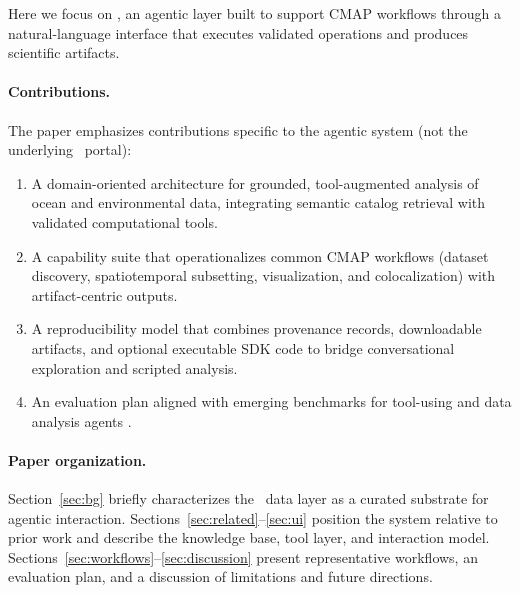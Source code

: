 Here we focus on \cmapagent, an agentic layer built to support CMAP workflows through a natural-language interface that executes validated operations and produces scientific artifacts.

\paragraph{Contributions.}
The paper emphasizes contributions specific to the agentic system (not the underlying \cmap\ portal):
\begin{enumerate}[leftmargin=*]
  \item A domain-oriented architecture for grounded, tool-augmented analysis of ocean and environmental data, integrating semantic catalog retrieval with validated computational tools.
  \item A capability suite that operationalizes common CMAP workflows (dataset discovery, spatiotemporal subsetting, visualization, and colocalization) with artifact-centric outputs.
  \item A reproducibility model that combines provenance records, downloadable artifacts, and optional executable SDK code to bridge conversational exploration and scripted analysis.
  \item An evaluation plan aligned with emerging benchmarks for tool-using and data analysis agents \citep{Zhang2024DSEval,Li2025IDABench}.
\end{enumerate}

\paragraph{Paper organization.}
Section~\ref{sec:bg} briefly characterizes the \cmap\ data layer as a curated substrate for agentic interaction.
Sections~\ref{sec:related}--\ref{sec:ui} position the system relative to prior work and describe the knowledge base, tool layer, and interaction model.
Sections~\ref{sec:workflows}--\ref{sec:discussion} present representative workflows, an evaluation plan, and a discussion of limitations and future directions.
